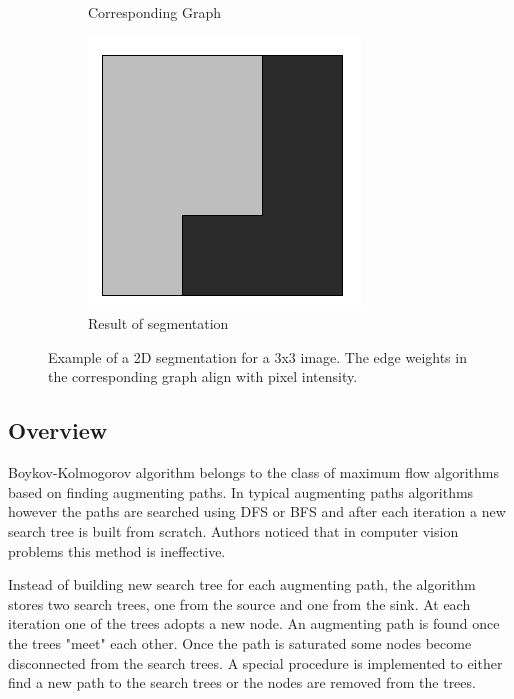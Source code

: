 \begin{figure}[h]
\begin{subfigure}[b]{0.3\textwidth}
        \caption{Corresponding Graph}
    \end{subfigure}
    \hfill
    \begin{subfigure}[b]{0.3\textwidth}
        \centering
        \includegraphics[width=\textwidth]{figures/iccv01-002.png}
        \caption{Result of segmentation}
    \end{subfigure}
    \caption{Example of a 2D segmentation for a 3x3 image. The edge weights in the corresponding graph align with pixel intensity. \cite{graphimage}
    }
\end{figure}

\subsection{Overview}

Boykov-Kolmogorov \cite{BK} algorithm belongs to the class of maximum flow algorithms based on finding augmenting paths.
In typical augmenting paths algorithms however the paths are searched using DFS or BFS and after each iteration a new search tree is built from scratch. Authors noticed that in computer vision problems this method is ineffective.

Instead of building new search tree for each augmenting path, the algorithm stores two search trees, one from the source and one from the sink. At each iteration one of the trees adopts a new node. An augmenting path is found once the trees "meet" each other. Once the path is saturated some nodes become disconnected from the search trees. A special procedure is implemented to either find a new path to the search trees or the nodes are removed from the trees.

